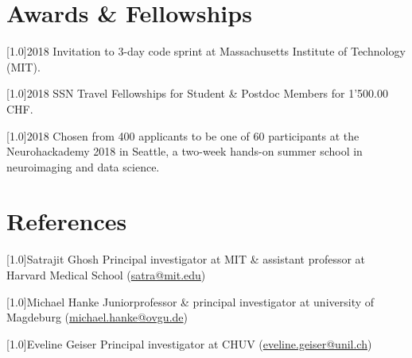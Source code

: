 \documentclass[english]{cv-style}
\begin{document}
\section{Awards \& Fellowships}
\begin{publist}

\publications
  {\scalebox{.8}[1.0]{2018}}
  {Invitation to 3-day code sprint at Massachusetts Institute of Technology (MIT).}

\publications
  {\scalebox{.8}[1.0]{2018}}
  {SSN Travel Fellowships for Student \& Postdoc Members for 1'500.00 CHF.}

\publications
  {\scalebox{.8}[1.0]{2018}}
  {Chosen from 400 applicants to be one of 60 participants at the Neurohackademy 2018 in Seattle, a two-week hands-on summer school in neuroimaging and data science.}

\end{publist}


\section{References}
\begin{reflist}
  {\scalebox{1.0}[1.0]{Satrajit Ghosh}}
  {Principal investigator at MIT \& assistant professor at Harvard Medical School (\href{mailto:satra@mit.edu}{satra@mit.edu})}

  {\scalebox{1.0}[1.0]{Michael Hanke}}
  {Junior\-professor \& principal investigator at university of Magdeburg (\href{mailto:michael.hanke@ovgu.de}{michael.hanke@ovgu.de})}

  {\scalebox{1.0}[1.0]{Eveline Geiser}}
  {Principal investigator at CHUV (\href{mailto:eveline.geiser@unil.ch}{eveline.geiser@unil.ch})}

\end{reflist}

\end{document}
